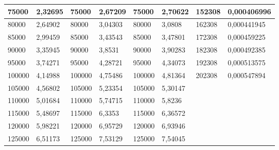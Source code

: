 \documentclass[11pt]{article}
\begin{document}
\begin{table}[!ht]
\begin{tabular}{|l|l|l|l|l|l|l|l|}
        75000 & 2,32695 & 75000 & 2,67209 & 75000 & 2,70622 & 152308 & 0,000406996 \\ \hline
        80000 & 2,64902 & 80000 & 3,04303 & 80000 & 3,0808 & 162308 & 0,000441945 \\ \hline
        85000 & 2,99459 & 85000 & 3,43543 & 85000 & 3,47801 & 172308 & 0,000459225 \\ \hline
        90000 & 3,35945 & 90000 & 3,8531 & 90000 & 3,90283 & 182308 & 0,000492385 \\ \hline
        95000 & 3,74271 & 95000 & 4,28721 & 95000 & 4,34073 & 192308 & 0,000513575 \\ \hline
        100000 & 4,14988 & 100000 & 4,75486 & 100000 & 4,81364 & 202308 & 0,000547894 \\ \hline
        105000 & 4,56802 & 105000 & 5,23354 & 105000 & 5,30147 & ~ & ~ \\ \hline
        110000 & 5,01684 & 110000 & 5,74715 & 110000 & 5,8236 & ~ & ~ \\ \hline
        115000 & 5,48697 & 115000 & 6,3353 & 115000 & 6,36572 & ~ & ~ \\ \hline
        120000 & 5,98221 & 120000 & 6,95729 & 120000 & 6,93946 & ~ & ~ \\ \hline
        125000 & 6,51173 & 125000 & 7,53129 & 125000 & 7,54045 & ~ & \\\hline
    \end{tabular}
\end{table}
\end{document}

